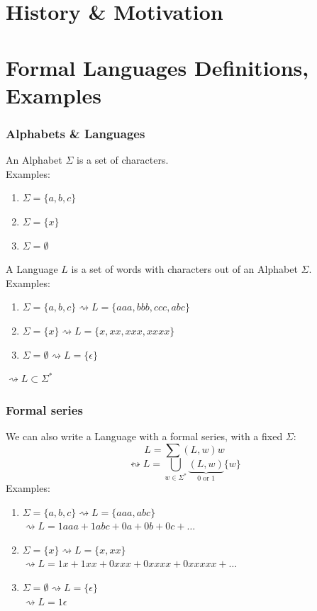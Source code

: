 \documentclass{beamer}
\begin{document}
\section{History \& Motivation}
\section{Formal Languages Definitions, Examples}
\begin{frame}
  \frametitle{Alphabets \& Languages}
  An Alphabet $\Sigma$ is a set of characters.\\
  Examples:
  \begin{enumerate}
    \item $\Sigma = \{a,b,c\}$
    \item $\Sigma = \{x\}$
    \item $\Sigma = \emptyset$
  \end{enumerate}
  A Language $L$ is a set of words with characters 
  out of an Alphabet $\Sigma$.\\
  Examples:
  \begin{enumerate}
    \item $\Sigma = \{a,b,c\} \rightsquigarrow L = \{aaa, bbb, ccc, abc\}$
    \item $\Sigma = \{x\} \rightsquigarrow L = \{ x, xx, xxx, xxxx\}$
    \item $\Sigma = \emptyset \rightsquigarrow L = \{\epsilon \}$
  \end{enumerate}
  $\rightsquigarrow L \subset \Sigma^*$
\end{frame}

\begin{frame}
  \frametitle{Formal series}
  We can also write a Language with a formal series, with a fixed $\Sigma$:
    \[ L = \sum (L,w)w\]
    \[ 
      \leftrightsquigarrow  L = 
      \bigcup_{w \in \Sigma^{*}}
      \underbrace{(L,w)}_\text{0 or 1}
      \{w\} 
    \]
  Examples:
  \begin{enumerate}
    \item $\Sigma = \{a,b,c\} \rightsquigarrow L = \{aaa, abc\}$ \\
          $\rightsquigarrow L = 1aaa + 1abc + 0a + 0b + 0c + \dots$
    \item $\Sigma = \{x\} \rightsquigarrow L = \{ x, xx\}$ \\
            $\rightsquigarrow L = 1x + 1xx + 0xxx + 0xxxx +  0xxxxx + \dots$
          \item $\Sigma = \emptyset \rightsquigarrow L = \{ \epsilon \}$ \\
            $\rightsquigarrow L = 1\epsilon$
  \end{enumerate}
\end{frame}
\end{document}
